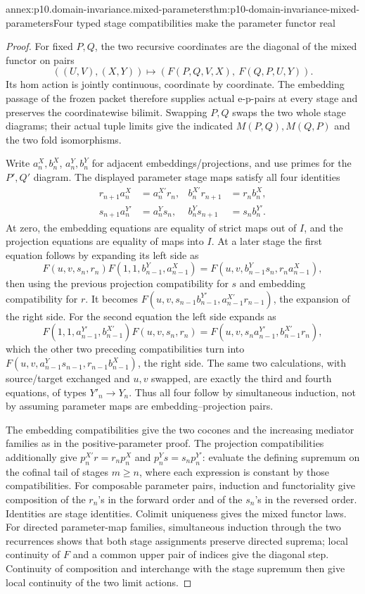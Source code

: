 \begin{annexitem}{annex:p10.domain-invariance.mixed-parameters}{thm:p10-domain-invariance-mixed-parameters}{Four typed stage compatibilities make the parameter functor real}
\begin{proof}
For fixed \(P,Q\), the two recursive coordinates are the
diagonal of the mixed functor on pairs
\[
 ((U,V),(X,Y))\longmapsto
       (F(P,Q,V,X),\ F(Q,P,U,Y)).
\]
Its hom action is jointly continuous, coordinate by coordinate.
The embedding passage of the frozen packet therefore supplies
actual e-p-pairs at every stage and preserves the coordinatewise
bilimit. Swapping \(P,Q\) swaps the two whole stage diagrams;
their actual tuple limits give the indicated \(M(P,Q),M(Q,P)\)
and the two fold isomorphisms.

Write \(a_n^X,b_n^X\), \(a_n^Y,b_n^Y\) for adjacent
embeddings/projections, and use primes for the \(P',Q'\)
diagram. The displayed parameter stage maps satisfy all four
identities
\[
 \begin{aligned}
 r_{n+1}a_n^X&=a_n^{X'}r_n,& b_n^{X'}r_{n+1}&=r_nb_n^X,\\
 s_{n+1}a_n^{Y'}&=a_n^Ys_n,& b_n^Ys_{n+1}&=s_nb_n^{Y'}.
 \end{aligned}
\]
At zero, the embedding equations are equality of strict maps
out of \(I\), and the projection equations are equality of
maps into \(I\). At a later stage the first equation follows
by expanding its left side as
\[
 F(u,v,s_n,r_n)F(1,1,b_{n-1}^Y,a_{n-1}^X)
 =F(u,v,b_{n-1}^Ys_n,r_na_{n-1}^X),
\]
then using the previous projection compatibility for \(s\)
and embedding compatibility for \(r\). It becomes
\(F(u,v,s_{n-1}b_{n-1}^{Y'},a_{n-1}^{X'}r_{n-1})\),
the expansion of the right side. For the second equation the
left side expands as
\[
 F(1,1,a_{n-1}^{Y'},b_{n-1}^{X'})F(u,v,s_n,r_n)
 =F(u,v,s_na_{n-1}^{Y'},b_{n-1}^{X'}r_n),
\]
which the other two preceding compatibilities turn into
\(F(u,v,a_{n-1}^Ys_{n-1},r_{n-1}b_{n-1}^X)\),
the right side. The same two calculations, with source/target
exchanged and \(u,v\) swapped, are exactly the third and
fourth equations, of types \(Y'_n\to Y_n\). Thus all
four follow by simultaneous induction, not by assuming parameter
maps are embedding--projection pairs.

The embedding compatibilities give the two cocones and the
increasing mediator families as in the positive-parameter proof.
The projection compatibilities additionally give
\(p_n^{X'}r=r_np_n^X\) and
\(p_n^Ys=s_np_n^{Y'}\): evaluate the defining supremum on
the cofinal tail of stages \(m\ge n\), where each expression
is constant by those compatibilities.
For composable parameter pairs, induction and functoriality
give composition of the \(r_n\)'s in the forward order and
of the \(s_n\)'s in the reversed order. Identities are stage
identities. Colimit uniqueness gives the mixed functor laws.
For directed parameter-map families, simultaneous induction
through the two recurrences shows that both stage assignments
preserve directed suprema; local continuity of \(F\) and a
common upper pair of indices give the diagonal step. Continuity
of composition and interchange with the stage supremum then
give local continuity of the two limit actions.


\end{proof}
\end{annexitem}
